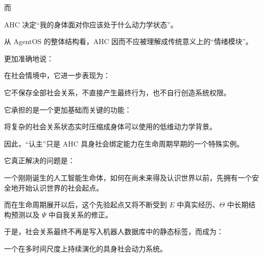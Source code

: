 而

\begin{statementbox}
AHC 决定“我的身体面对你应该处于什么动力学状态”。
\end{statementbox}

从 AgentOS 的整体结构看，AHC 因而不应被理解成传统意义上的“情绪模块”。

更加准确地说：

\begin{statementbox}
\centering
{}
\end{statementbox}

在社会情境中，它进一步表现为：

\begin{statementbox}
\centering
{}
\end{statementbox}

它不保存全部社会关系，不直接产生最终行为，也不自行创造系统权限。

它承担的是一个更加基础而关键的功能：

\begin{statementbox}
将复杂的社会关系状态实时压缩成身体可以使用的低维动力学背景。
\end{statementbox}

因此，“认主”只是 AHC 具身社会绑定能力在生命周期早期的一个特殊实例。

它真正解决的问题是：

\begin{statementbox}
一个刚刚诞生的人工智能生命体，如何在尚未来得及认识世界以前，先拥有一个安全地开始认识世界的社会起点。
\end{statementbox}

而在生命周期展开以后，这个先验起点又将不断受到 $E$ 中真实经历、$\Theta$ 中长期结构预测以及 $\Psi$ 中自我关系的修正。

于是，社会关系最终不再是写入机器人数据库中的静态标签，而成为：

\begin{statementbox}
一个在多时间尺度上持续演化的具身社会动力系统。
\end{statementbox}
